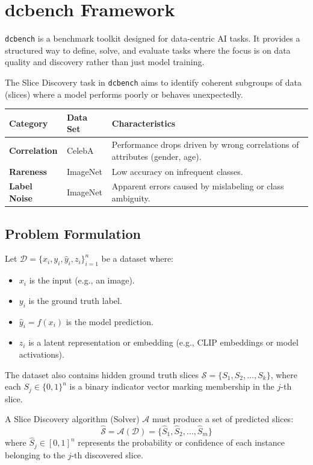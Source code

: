 \section{dcbench Framework}

\texttt{dcbench} is a benchmark toolkit designed for data-centric AI tasks. It provides a structured way to define, solve, and evaluate tasks where the focus is on data quality and discovery rather than just model training.

The Slice Discovery task in \texttt{dcbench} aims to identify coherent subgroups of data (slices) where a model performs poorly or behaves unexpectedly.

\begin{table}[h]
\centering
\begin{tabular}{|l|l|l|}
\hline
\textbf{Category} & \textbf{Data Set} & \textbf{Characteristics} \\ \hline
\textbf{Correlation} & CelebA & Performance drops driven by wrong correlations of attributes (gender, age). \\ \hline
\textbf{Rareness} & ImageNet & Low accuracy on infrequent classes. \\ \hline
\textbf{Label Noise} & ImageNet & Apparent errors caused by mislabeling or class ambiguity. \\ \hline
\end{tabular}
\end{table}

\subsection{Problem Formulation}
Let $\mathcal{D} = \{x_i, y_i, \hat{y}_i, z_i\}_{i=1}^n$ be a dataset where:
\begin{itemize}
    \item $x_i$ is the input (e.g., an image).
    \item $y_i$ is the ground truth label.
    \item $\hat{y}_i = f(x_i)$ is the model prediction.
    \item $z_i$ is a latent representation or embedding (e.g., CLIP embeddings or model activations).
\end{itemize}

The dataset also contains hidden ground truth slices $\mathcal{S} = \{S_1, S_2, \dots, S_k\}$, where each $S_j \in \{0, 1\}^n$ is a binary indicator vector marking membership in the $j$-th slice.

A Slice Discovery algorithm (Solver) $\mathcal{A}$ must produce a set of predicted slices:
\[ \hat{\mathcal{S}} = \mathcal{A}(\mathcal{D}) = \{\hat{S}_1, \hat{S}_2, \dots, \hat{S}_m\} \]
where $\hat{S}_j \in [0, 1]^n$ represents the probability or confidence of each instance belonging to the $j$-th discovered slice.

